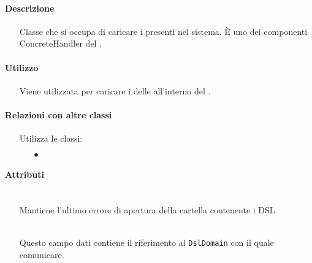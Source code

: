 \paragraph*{Descrizione}
\begin{itemize}
\item[] Classe che si occupa di caricare i  presenti nel sistema. È uno dei componenti ConcreteHandler del  .
\end{itemize}

\paragraph*{Utilizzo}
\begin{itemize}
\item[] Viene utilizzata per caricare i  delle  all'interno del .
\end{itemize}

\paragraph*{Relazioni con altre classi}
\begin{itemize}


\item[] Utilizza le classi:
\begin{itemize}
\item[$\bullet$] 
\end{itemize}
\end{itemize}

\paragraph*{Attributi}
\begin{itemize}
\item[]  \\ Mantiene l'ultimo errore di apertura della cartella contenente i DSL.
\item[]  \\ Questo campo dati contiene il riferimento al \texttt{DslDomain} con il quale comunicare.
\end{itemize}

